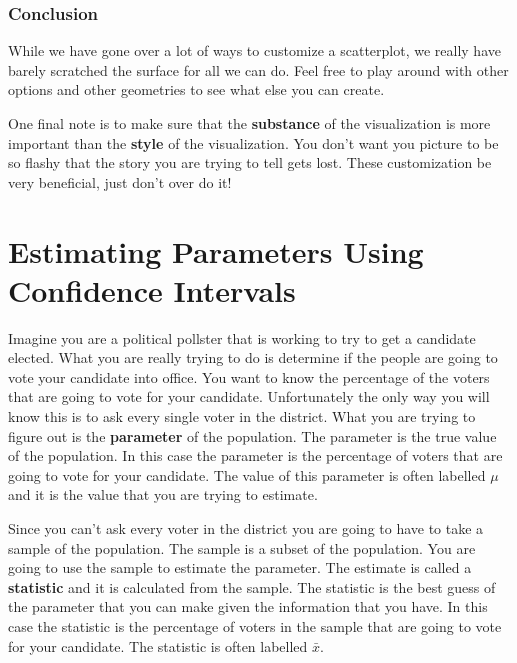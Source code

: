 \documentclass[
  letterpaper,
  DIV=11,
  numbers=noendperiod]{scrreprt}
\begin{document}
\subsection*{Conclusion}\label{conclusion-7}

While we have gone over a lot of ways to customize a scatterplot, we
really have barely scratched the surface for all we can do. Feel free to
play around with other options and other geometries to see what else you
can create.

One final note is to make sure that the \textbf{substance} of the
visualization is more important than the \textbf{style} of the
visualization. You don't want you picture to be so flashy that the story
you are trying to tell gets lost. These customization be very
beneficial, just don't over do it!


\chapter*{Estimating Parameters Using Confidence
Intervals}\label{estimating-parameters-using-confidence-intervals}


Imagine you are a political pollster that is working to try to get a
candidate elected. What you are really trying to do is determine if the
people are going to vote your candidate into office. You want to know
the percentage of the voters that are going to vote for your candidate.
Unfortunately the only way you will know this is to ask every single
voter in the district. What you are trying to figure out is the
\textbf{parameter} of the population. The parameter is the true value of
the population. In this case the parameter is the percentage of voters
that are going to vote for your candidate. The value of this parameter
is often labelled \(\mu\) and it is the value that you are trying to
estimate.

Since you can't ask every voter in the district you are going to have to
take a sample of the population. The sample is a subset of the
population. You are going to use the sample to estimate the parameter.
The estimate is called a \textbf{statistic} and it is calculated from
the sample. The statistic is the best guess of the parameter that you
can make given the information that you have. In this case the statistic
is the percentage of voters in the sample that are going to vote for
your candidate. The statistic is often labelled \(\bar{x}\).
\end{document}
